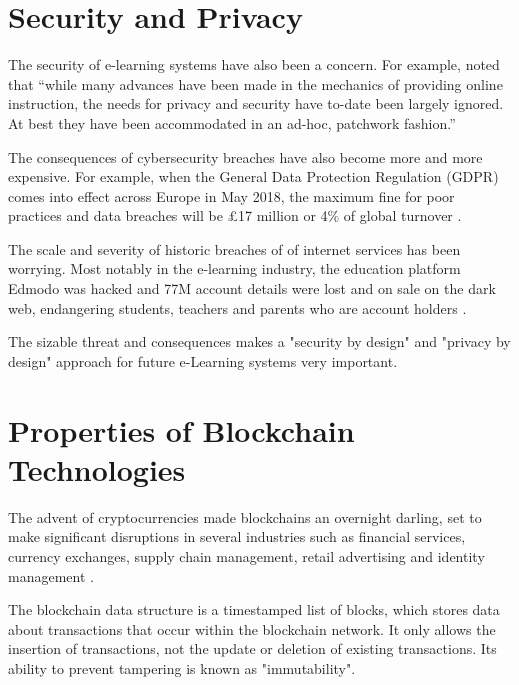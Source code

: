 \section{Security and Privacy}

The security of e-learning systems have also been a concern. For example, \citet{el2003privacy} noted that “while many
advances have been made in the mechanics of providing online instruction, the needs for privacy and security have to-date
been largely ignored. At best they have been accommodated in an ad-hoc, patchwork fashion.”

The consequences of cybersecurity breaches have also become more and more expensive. For example, when the General Data
Protection Regulation (GDPR) comes into effect across Europe in May 2018, the maximum fine for poor practices and data
breaches will be £17 million or 4\% of global turnover \citep{ico2017gdpr}.

The scale and severity of historic breaches of of internet services has been worrying. Most notably in the e-learning
industry, the education platform Edmodo was hacked and 77M account details were lost and on sale on the dark
web, endangering students, teachers and parents who are account holders \citep{opsecmonkey2017edmodo}.

The sizable threat and consequences makes a "security by design" and "privacy by design" approach for future e-Learning
systems very important.

\section{Properties of Blockchain Technologies}

The advent of cryptocurrencies made blockchains an overnight darling, set to make significant disruptions
in several industries such as financial services, currency exchanges, supply chain management, retail
advertising and identity management \citep{forbes2017industries}.

The blockchain data structure is a timestamped list of blocks, which stores data about transactions
that occur within the blockchain network. It only allows the insertion of transactions, not the update
or deletion of existing transactions. Its ability to prevent tampering is known as "immutability". \citep[p.182]{xu2016blockchain}

